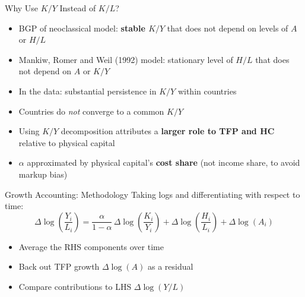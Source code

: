\documentclass[blue]{beamer}
\begin{document}
\begin{frame}{Why Use $K/Y$ Instead of $K/L$?}
	\begin{itemize}
		\item BGP of neoclassical model: \textbf{stable $K/Y$} that does not depend on levels of $A$ or $H/L$
		\item Mankiw, Romer and Weil (1992) model: stationary level of $H/L$ that does not depend on $A$ or $K/Y$
		\item In the data: substantial persistence in $K/Y$ within countries 
		\item Countries do \emph{not} converge to a common $K/Y$
		\item Using $K/Y$ decomposition attributes a \textbf{larger role to TFP and HC} relative to physical capital
		\item $\alpha$ approximated by physical capital's \textbf{cost share} (not income share, to avoid markup bias)
	\end{itemize}
\end{frame}



\begin{frame}{Growth Accounting: Methodology}
	Taking logs and differentiating with respect to time:
	\[
	\Delta \log\left(\frac{Y_i}{L_i}\right) = \frac{\alpha}{1-\alpha}\, \Delta \log\left(\frac{K_i}{Y_i}\right) + \Delta \log\left(\frac{H_i}{L_i}\right) + \Delta \log(A_i) 
	\]
	
	\begin{itemize}
		\item Average the RHS components over time
		\item Back out TFP growth $\Delta\log(A)$ as a residual
		\item Compare contributions to LHS $\Delta\log(Y/L)$
	\end{itemize}
\end{frame}
\end{document}
